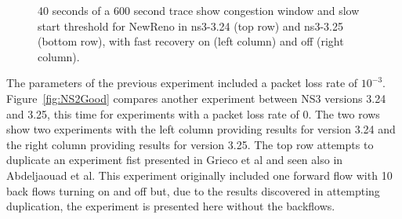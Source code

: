 \documentclass[11pt]{ucthesis}
\begin{document}
\begin{figure}[h!]
\begin{center}
\end{center}
\caption{40 seconds of a 600 second trace show congestion window and slow start threshold for NewReno in ns3-3.24 (top row) and ns3-3.25 (bottom row), with fast recovery on (left column) and off (right column).}
\label{fig:NS3Val}
\end{figure}

The parameters of the previous experiment included a packet loss rate of $10^{-3}$. Figure~\ref{fig:NS2Good} compares another experiment between NS3 versions 3.24 and 3.25, this time for experiments with a packet loss rate of 0. The two rows show two experiments with the left column providing results for version 3.24 and the right column providing results for version 3.25. The top row attempts to duplicate an experiment fist presented in Grieco et al\cite{NS2WP} and seen also in Abdeljaouad et al\cite{NS2Val}. This experiment originally included one forward flow with 10 back flows turning on and off but, due to the results discovered in attempting duplication, the experiment is presented here without the backflows. %
\end{document}
